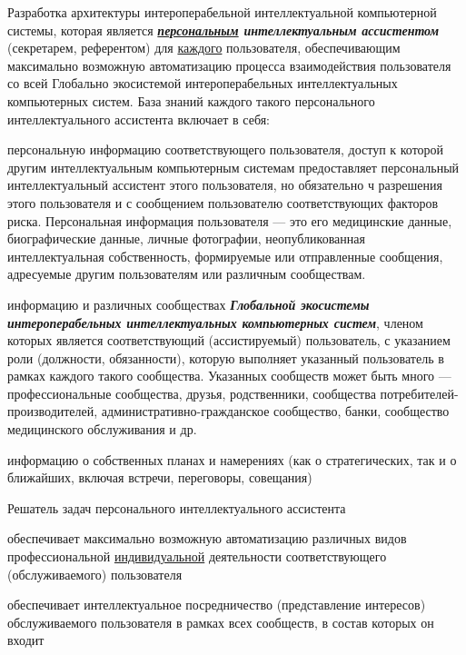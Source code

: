 \begin{textitemize}
	\item Разработка архитектуры интероперабельной интеллектуальной компьютерной системы, которая является \textbf{\textit{\uline{персональным} интеллектуальным ассистентом}} (секретарем, референтом) для \uline{каждого} пользователя, обеспечивающим максимально возможную автоматизацию процесса взаимодействия пользователя со всей Глобально экосистемой интероперабельных интеллектуальных компьютерных систем. База знаний каждого такого персонального интеллектуального ассистента включает в себя:
	\begin{textitemize}
		\item персональную информацию соответствующего пользователя, доступ к которой другим интеллектуальным компьютерным системам предоставляет персональный интеллектуальный ассистент этого пользователя, но обязательно ч разрешения этого пользователя и с сообщением пользователю соответствующих факторов риска. Персональная информация пользователя --- это его медицинские данные, биографические данные, личные фотографии, неопубликованная интеллектуальная собственность, формируемые или отправленные сообщения, адресуемые другим пользователям или различным сообществам.
		\item информацию и различных сообществах \textbf{\textit{Глобальной экосистемы интероперабельных интеллектуальных компьютерных систем}}, членом которых является соответствующий (ассистируемый) пользователь, с указанием роли (должности, обязанности), которую выполняет указанный пользователь в рамках каждого такого сообщества. Указанных сообществ может быть много --- профессиональные сообщества, друзья, родственники, сообщества потребителей-производителей, административно-гражданское сообщество, банки, сообщество медицинского обслуживания и др.
		\item информацию о собственных планах и намерениях (как о стратегических, так и о ближайших, включая встречи, переговоры, совещания)
	\end{textitemize}
	Решатель задач персонального интеллектуального ассистента
	\begin{textitemize}
		\item обеспечивает максимально возможную автоматизацию различных видов профессиональной \uline{индивидуальной} деятельности соответствующего (обслуживаемого) пользователя 
		\item обеспечивает интеллектуальное посредничество (представление интересов) обслуживаемого пользователя в рамках всех сообществ, в состав которых он входит
	\end{textitemize}

\end{textitemize}

